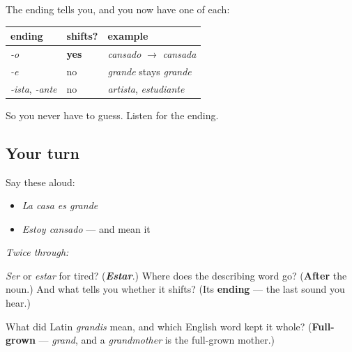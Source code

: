 \begin{grammarlens}[title={Grammar Lens: which words shift}]
The ending tells you, and you now have one of each:

\noindent
\begin{tabularx}{\linewidth}{@{}>{\raggedright\arraybackslash}X>{\raggedright\arraybackslash}X>{\raggedright\arraybackslash}X@{}}
\toprule
\textbf{ending} & \textbf{shifts?} & \textbf{example} \\
\midrule
\emph{-o} & \textbf{yes} & \emph{cansado} $\to$ \emph{cansada} \\
\emph{-e} & no & \emph{grande} stays \emph{grande} \\
\emph{-ista}, \emph{-ante} & no & \emph{artista}, \emph{estudiante} \\
\bottomrule
\end{tabularx}

So you never have to guess. Listen for the ending.
\end{grammarlens}

\subsection*{Your turn}
Say these aloud:

\begin{itemize}
\raggedright
  \item \emph{La casa es grande}
  \item \emph{Estoy cansado} — and mean it
\end{itemize}

\emph{Twice through:}

\begin{tcolorbox}[breakable,colback=teal!4,colframe=teal!35!black,title={Before you move on}]
\emph{Ser} or \emph{estar} for tired? (\emph{\textbf{Estar}}.) Where does the describing word go? (\textbf{After} the noun.) And what tells you whether it shifts? (Its \textbf{ending} — the last sound you hear.)

What did Latin \emph{grandis} mean, and which English word kept it whole? (\textbf{Full-grown} — \emph{grand}, and a \emph{grandmother} is the full-grown mother.)
\end{tcolorbox}
